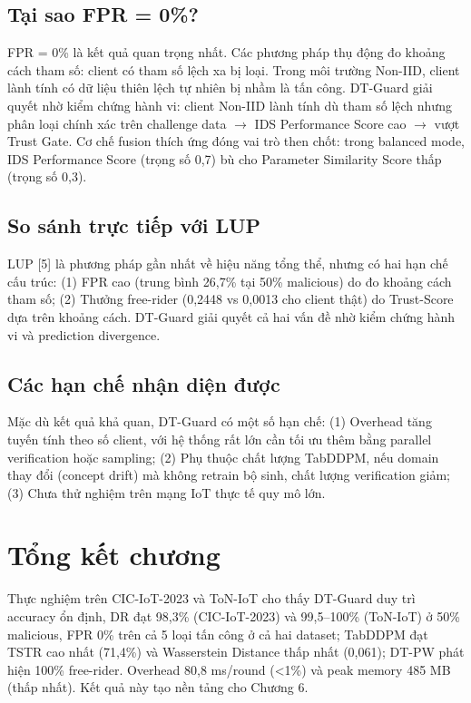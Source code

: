 \subsection{Tại sao FPR = 0\%?}
FPR = 0\% là kết quả quan trọng nhất. Các phương pháp thụ động đo khoảng cách tham số: client có tham số lệch xa bị loại. Trong môi trường Non-IID, client lành tính có dữ liệu thiên lệch tự nhiên bị nhầm là tấn công. DT-Guard giải quyết nhờ kiểm chứng hành vi: client Non-IID lành tính dù tham số lệch nhưng phân loại chính xác trên challenge data $\rightarrow$ IDS Performance Score cao $\rightarrow$ vượt Trust Gate. Cơ chế fusion thích ứng đóng vai trò then chốt: trong balanced mode, IDS Performance Score (trọng số 0,7) bù cho Parameter Similarity Score thấp (trọng số 0,3).

\subsection{So sánh trực tiếp với LUP}
LUP {[}5{]} là phương pháp gần nhất về hiệu năng tổng thể, nhưng có hai hạn chế cấu trúc: (1) FPR cao (trung bình 26,7\% tại 50\% malicious) do đo khoảng cách tham số; (2) Thưởng free-rider (0,2448 vs 0,0013 cho client thật) do Trust-Score dựa trên khoảng cách. DT-Guard giải quyết cả hai vấn đề nhờ kiểm chứng hành vi và prediction divergence.

\subsection{Các hạn chế nhận diện được}
Mặc dù kết quả khả quan, DT-Guard có một số hạn chế: (1) Overhead tăng tuyến tính theo số client, với hệ thống rất lớn cần tối ưu thêm bằng parallel verification hoặc sampling; (2) Phụ thuộc chất lượng TabDDPM, nếu domain thay đổi (concept drift) mà không retrain bộ sinh, chất lượng verification giảm; (3) Chưa thử nghiệm trên mạng IoT thực tế quy mô lớn.

\section{Tổng kết chương}
Thực nghiệm trên CIC-IoT-2023 và ToN-IoT cho thấy DT-Guard duy trì accuracy ổn định, DR đạt 98,3\% (CIC-IoT-2023) và 99,5--100\% (ToN-IoT) ở 50\% malicious, FPR 0\% trên cả 5 loại tấn công ở cả hai dataset; TabDDPM đạt TSTR cao nhất (71,4\%) và Wasserstein Distance thấp nhất (0,061); DT-PW phát hiện 100\% free-rider. Overhead 80,8 ms/round (\textless 1\%) và peak memory 485 MB (thấp nhất). Kết quả này tạo nền tảng cho Chương 6.
